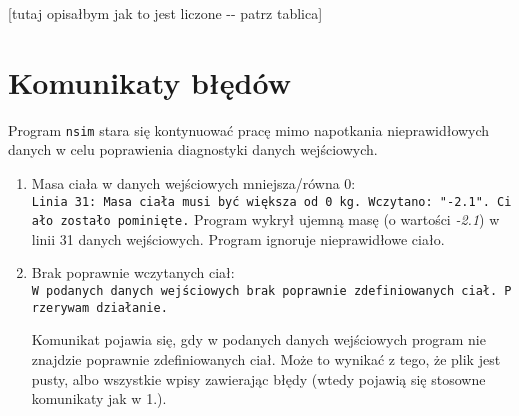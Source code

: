 \documentclass[]{article}
\begin{document}
{[}tutaj opisałbym jak to jest liczone -\/- patrz tablica{]}

\section{Komunikaty błędów}\label{header-n281}

Program \texttt{nsim} stara się kontynuować pracę mimo napotkania
nieprawidłowych danych w celu poprawienia diagnostyki danych
wejściowych.

\begin{enumerate}
\def\labelenumi{\arabic{enumi}.}
\item
  Masa ciała w danych wejściowych mniejsza/równa 0:
  \texttt{Linia\ 31:\ Masa\ ciała\ musi\ być\ większa\ od\ 0\ kg.\ Wczytano:\ "-2.1".\ Ciało\ zostało\ pominięte.}
  Program wykrył ujemną masę (o wartości \emph{-2.1}) w linii 31 danych
  wejściowych. Program ignoruje nieprawidłowe ciało.
\item
  Brak poprawnie wczytanych ciał:
  \texttt{W\ podanych\ danych\ wejściowych\ brak\ poprawnie\ zdefiniowanych\ ciał.\ Przerywam\ działanie.}

  Komunikat pojawia się, gdy w podanych danych wejściowych program nie
  znajdzie poprawnie zdefiniowanych ciał. Może to wynikać z tego, że
  plik jest pusty, albo wszystkie wpisy zawierając błędy (wtedy pojawią
  się stosowne komunikaty jak w 1.).
\end{enumerate}
\end{document}
